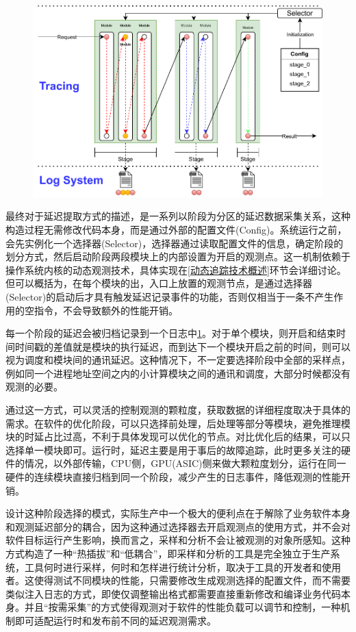 \documentclass[master]{shtthesis}
\begin{document}
\begin{figure}[htbp]
	\centering
	\includegraphics[width=12cm]{img/trace.pdf}
	\label{论文观测机制示意图}
\end{figure}

最终对于延迟提取方式的描述，是一系列以阶段为分区的延迟数据采集关系，这种构造过程无需修改代码本身，而是通过外部的配置文件(Config)。系统运行之前，会先实例化一个选择器(Selector)，选择器通过读取配置文件的信息，确定阶段的划分方式，然后启动阶段两段模块上的内部设置为开启的观测点。这一机制依赖于操作系统内核的动态观测技术，具体实现在\ref{动态追踪技术概述}环节会详细讨论。但可以概括为，在每个模块的出，入口上放置的观测节点，是通过选择器(Selector)的启动后才具有触发延迟记录事件的功能，否则仅相当于一条不产生作用的空指令，不会导致额外的性能开销。

每一个阶段的延迟会被归档记录到一个日志中\ref{论文观测机制示意图}。对于单个模块，则开启和结束时间时间戳的差值就是模块的执行延迟，而到达下一个模块开启之前的时间，则可以视为调度和模块间的通讯延迟。这种情况下，不一定要选择阶段中全部的采样点，例如同一个进程地址空间之内的小计算模块之间的通讯和调度，大部分时候都没有观测的必要。


通过这一方式，可以灵活的控制观测的颗粒度，获取数据的详细程度取决于具体的需求。在软件的优化阶段，可以只选择前处理，后处理等部分等模块，避免推理模块的时延占比过高，不利于具体发现可以优化的节点。对比优化后的结果，可以只选择单一模块即可。运行时，延迟主要是用于事后的故障追踪，此时更多关注的硬件的情况，以外部传输，CPU侧，GPU(ASIC)侧来做大颗粒度划分，运行在同一硬件的连续模块直接归档到同一个阶段，减少产生的日志事件，降低观测的性能开销。

设计这种阶段选择的模式，实际生产中一个极大的便利点在于解除了业务软件本身和观测延迟部分的耦合，因为这种通过选择器去开启观测点的使用方式，并不会对软件目标运行产生影响，换而言之，采样和分析不会让被观测的对象所感知。这种方式构造了一种“热插拔”和“低耦合”，即采样和分析的工具是完全独立于生产系统，工具何时进行采样，何时和怎样进行统计分析，取决于工具的开发者和使用者。这使得测试不同模块的性能，只需要修改生成观测选择的配置文件，而不需要类似注入日志的方式，即使仅调整输出格式都需要直接重新修改和编译业务代码本身。并且“按需采集”的方式使得观测对于软件的性能负载可以调节和控制，一种机制即可适配运行时和发布前不同的延迟观测需求。
\end{document}
